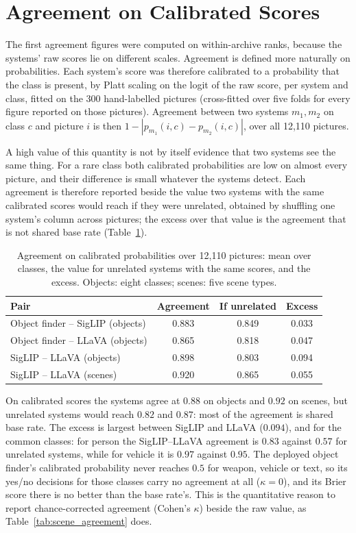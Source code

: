 \section{Agreement on Calibrated Scores}
\label{sec:calibrated_agreement}

The first agreement figures were computed on within-archive ranks, because the systems' raw scores lie on different scales. Agreement is defined more naturally on probabilities. Each system's score was therefore calibrated to a probability that the class is present, by Platt scaling on the logit of the raw score, per system and class, fitted on the 300 hand-labelled pictures (cross-fitted over five folds for every figure reported on those pictures). Agreement between two systems $m_1, m_2$ on class $c$ and picture $i$ is then $1 - |p_{m_1}(i,c) - p_{m_2}(i,c)|$, over all 12,110 pictures.

A high value of this quantity is not by itself evidence that two systems see the same thing. For a rare class both calibrated probabilities are low on almost every picture, and their difference is small whatever the systems detect. Each agreement is therefore reported beside the value two systems with the same calibrated scores would reach if they were unrelated, obtained by shuffling one system's column across pictures; the excess over that value is the agreement that is not shared base rate (Table~\ref{tab:calibrated_agreement}).

\begin{table}[!htbp]
\centering
\caption[Agreement on calibrated probabilities]{Agreement on calibrated probabilities over 12,110 pictures: mean over classes, the value for unrelated systems with the same scores, and the excess. Objects: eight classes; scenes: five scene types.}
\label{tab:calibrated_agreement}
\begin{tabular}{lccc}
\toprule
Pair & Agreement & If unrelated & Excess \\
\midrule
Object finder -- SigLIP (objects) & 0.883 & 0.849 & 0.033 \\
Object finder -- LLaVA (objects) & 0.865 & 0.818 & 0.047 \\
SigLIP -- LLaVA (objects) & 0.898 & 0.803 & 0.094 \\
SigLIP -- LLaVA (scenes) & 0.920 & 0.865 & 0.055 \\
\bottomrule
\end{tabular}
\end{table}

On calibrated scores the systems agree at $0.88$ on objects and $0.92$ on scenes, but unrelated systems would reach $0.82$ and $0.87$: most of the agreement is shared base rate. The excess is largest between SigLIP and LLaVA ($0.094$), and for the common classes: for person the SigLIP--LLaVA agreement is $0.83$ against $0.57$ for unrelated systems, while for vehicle it is $0.97$ against $0.95$. The deployed object finder's calibrated probability never reaches $0.5$ for weapon, vehicle or text, so its yes/no decisions for those classes carry no agreement at all ($\kappa = 0$), and its Brier score there is no better than the base rate's. This is the quantitative reason to report chance-corrected agreement (Cohen's $\kappa$) beside the raw value, as Table~\ref{tab:scene_agreement} does.

